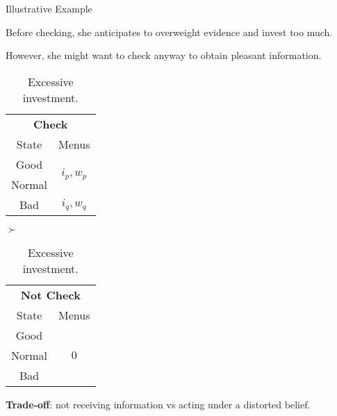 \documentclass[usenames,dvipsnames,aspectratio=169,11pt, envcountsect, handout]{beamer}
\begin{document}
\begin{frame}[noframenumbering]{Illustrative Example}

	Before checking, she anticipates to overweight evidence and invest too much.

	\vfill

	However, she might want to check anyway to obtain pleasant information. \pause

	\vfill

	\begin{table}[H]
		\centering
		\begin{minipage}{0.29\textwidth}

		\end{minipage}\hspace{0.3cm} %
		\begin{minipage}{0.29\textwidth}
			\centering
			\begin{tabular}{c | c}
				\multicolumn{2}{c}{\textbf{Check}}                                     \\
				State                & Menus                                           \\
				\hline
				{\color{blue}Good}   & \multirow{2}{*}{{\color{blue}\( i_{p}, w_p \)}} \\
				{\color{blue}Normal} &                                                 \\
				Bad                  & \(  i_{q}, w_q \)                               \\
			\end{tabular}
			\vspace{0.5cm} %
		\end{minipage}\hspace{0.5cm} %
		\( \succ \)
		\begin{minipage}{0.29\textwidth}
			\centering
			\begin{tabular}{c | c}
				\multicolumn{2}{c}{\textbf{Not Check}} \\
				State  & Menus                         \\
				\hline
				Good   & \multirow{3}{*}{ \( 0 \)}     \\
				Normal &                               \\
				Bad    &                               \\
			\end{tabular}
			\vspace{0.5cm} %
		\end{minipage}
		\caption{Excessive investment.} %
		\label{tab:excess}
	\end{table} \pause

	\vfill

	\textbf{Trade-off}: not receiving information vs acting under a distorted belief.

\end{frame}
\end{document}
